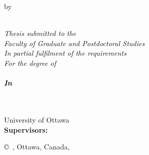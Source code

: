 
\pagestyle{empty} %

\begin{center}

\vspace*{0cm}
{\bfseries \LARGE %
  \thesistitlecoverpage}

\vspace*{1.0cm}
\normalsize
by \\
\vspace*{1.0cm}
\Large
\thesisauthor\\
\vspace*{1.5cm}
\normalsize
{\itshape
  Thesis submitted to the\\
  Faculty of Graduate and Postdoctoral Studies\\
  In partial fulfilment of the requirements\\
  For the degree of\\
  \vspace*{1.5cm}
  {\bfseries
    \degree\\
    In\\
    \nameofprogram\\}

  \vspace*{1.5cm}
  \academicunit\\
  University of Ottawa\\

  \vspace*{1.5cm}
  \textbf{Supervisors:}
  \supervisors\\
}
\vspace*{2.0cm}
\copyright~\thesisauthor, Ottawa, Canada, \graduationyear\\

\end{center}

\newpage

\pagestyle{plain} %
\setcounter{page}{2}
\cleardoublepage


